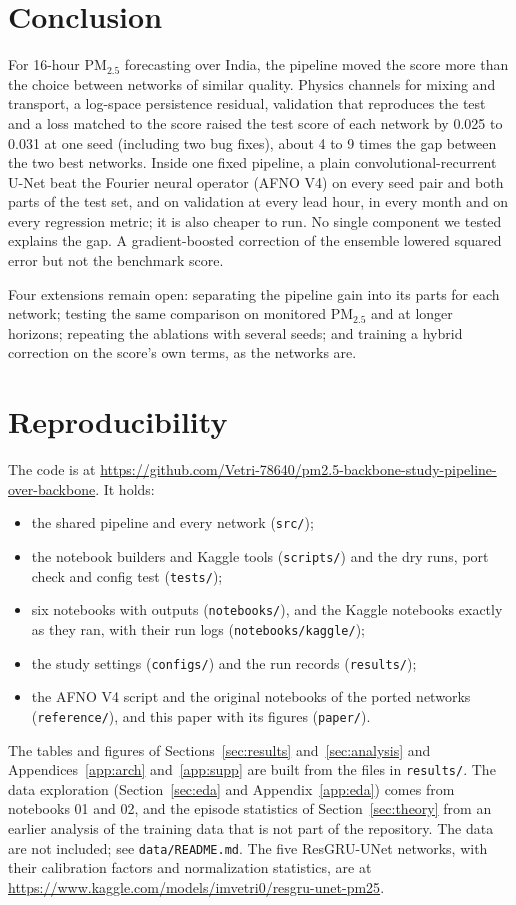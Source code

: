 \documentclass[journal]{IEEEtran}
\newcommand{\PM}{PM$_{2.5}$}
\begin{document}
\section{Conclusion}
\label{sec:conclusion}
For 16-hour \PM{} forecasting over India, the pipeline moved the score more than the choice between networks of similar quality. Physics channels for mixing and transport, a log-space persistence residual, validation that reproduces the test and a loss matched to the score raised the test score of each network by 0.025 to 0.031 at one seed (including two bug fixes), about 4 to 9 times the gap between the two best networks. Inside one fixed pipeline, a plain convolutional-recurrent U-Net beat the Fourier neural operator (AFNO V4) on every seed pair and both parts of the test set, and on validation at every lead hour, in every month and on every regression metric; it is also cheaper to run. No single component we tested explains the gap. A gradient-boosted correction of the ensemble lowered squared error but not the benchmark score.

Four extensions remain open: separating the pipeline gain into its parts for each network; testing the same comparison on monitored \PM{} and at longer horizons; repeating the ablations with several seeds; and training a hybrid correction on the score's own terms, as the networks are.

\section*{Reproducibility}
The code is at \url{https://github.com/Vetri-78640/pm2.5-backbone-study-pipeline-over-backbone}. It holds:
\begin{itemize}
\item the shared pipeline and every network (\texttt{src/});
\item the notebook builders and Kaggle tools (\texttt{scripts/}) and the dry runs, port check and config test (\texttt{tests/});
\item six notebooks with outputs (\texttt{notebooks/}), and the Kaggle notebooks exactly as they ran, with their run logs (\texttt{notebooks/kaggle/});
\item the study settings (\texttt{configs/}) and the run records (\texttt{results/});
\item the AFNO V4 script and the original notebooks of the ported networks (\texttt{reference/}), and this paper with its figures (\texttt{paper/}).
\end{itemize}
The tables and figures of Sections~\ref{sec:results} and~\ref{sec:analysis} and Appendices~\ref{app:arch} and~\ref{app:supp} are built from the files in \texttt{results/}. The data exploration (Section~\ref{sec:eda} and Appendix~\ref{app:eda}) comes from notebooks 01 and 02, and the episode statistics of Section~\ref{sec:theory} from an earlier analysis of the training data that is not part of the repository. The data are not included; see \texttt{data/README.md}. The five ResGRU-UNet networks, with their calibration factors and normalization statistics, are at \url{https://www.kaggle.com/models/imvetri0/resgru-unet-pm25}.
\end{document}
